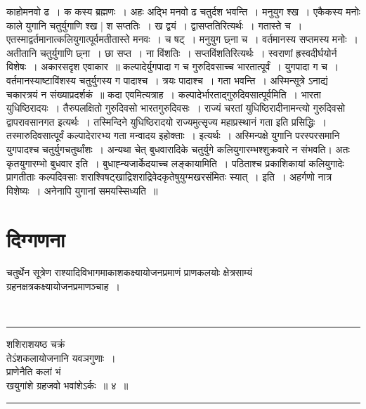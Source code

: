 \documentclass[12pt,a4paper]{report}
\newenvironment{moola}
{
~\\
\hrule
\begin{center}
\begin{LARGE}
}
{
\end{LARGE}
\end{center}
\hrule
~\\
}
\begin{document}
काहोमनवो ढ~। क कस्य ब्रह्मणः~। अहः अद्भि मनवो ढ चतुर्दश भवन्ति~। मनुयुग श्ख~। एकैकस्य मनोः काले युगानि चतुर्युगाणि श्ख | श सप्ततिः~। ख द्वयं~। द्वासप्ततिरित्यर्थः~। गतास्ते च~। एतस्माद्वर्तमानात्कलियुगात्पूर्वमतीतास्ते मनवः~। च षट्~। मनुयुग छ्ना च~। वर्तमानस्य सप्तमस्य मनोः~। अतीतानि चतुर्युगाणि छ्ना~। छा सप्त~। ना विंशतिः~। सप्तविंशतिरित्यर्थः~। स्वराणां ह्रस्वदीर्घयोर्न विशेषः~। अकारसदृश एवाकार~॥ कल्पादेर्युगपादा ग च गुरुदिवसाच्च भारतात्पूर्वं~। युगपादा ग च~। वर्तमानस्याष्टाविंशस्य चतुर्युगस्य ग पादाश्च~। त्रयः पादाश्च~। गता भवन्ति~। अस्मिन्सूत्रे ऽनाद्यं चकारत्रयं न संख्याप्रदर्शकं~॥ कदा एवमित्यत्राह~। कल्पादेर्भारताद्गुरुदिवसात्पूर्वमिति~। भारता युधिष्ठिरादयः~। तैरुपलक्षितो गुरुदिवसो भारतगुरुदिवसः~। राज्यं चरतां युधिष्ठिरादीनामन्त्यो गुरुदिवसो द्वापरावसानगत इत्यर्थः~। तस्मिन्दिने युधिष्ठिरादयो राज्यमुत्सृज्य महाप्रस्थानं गता इति प्रसिद्धिः~। तस्मारुदिवसात्पूर्वं कल्पादेरारभ्य गता मन्वादय इहोक्ताः~। इत्यर्थः~। अस्मिन्पक्षे युगानि परस्परसमानि युगपादश्च चतुर्युगचतुर्थांशः~। अन्यथा चेत् बुधवारादिके चतुर्युगे कलियुगारम्भश्शुक्रवारे न संभवति। अतः कृतयुगारम्भो बुधवार इति~। बुधाह्न्यजार्केदयाच्च लङ्कायामिति~। पठिताश्च प्रकाशिकायां कलियुगादेः प्रागतीताः कल्पदिवसाः शराश्विषट्खाद्रिशराद्रिवेदकृतेषुयुग्मखरसंमितः स्यात्~। इति~। अहर्गणो नात्र विशेष्यः~। अनेनापि युगानां समयस्सिध्यति~॥ 

\section{दिग्गणना}

चतुर्थेन सूत्रेण राश्यादिविभागमाकाशकक्ष्यायोजनप्रमाणं प्राणकलयोः क्षेत्रसाम्यं ग्रहनक्षत्रकक्ष्यायोजनप्रमाणञ्चाह~।

\begin{moola}
शशिराशयष्ठ चक्रं \\
तेऽंशकलायोजनानि यवञगुणाः~।\\
प्राणेनैति कलां भं \\ 
खयुगांशे ग्रहजवो भवांशेऽर्कः~॥ ४~॥
\end{moola}
\end{document}
